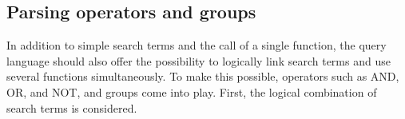 \subsection{Parsing operators and groups}
In addition to simple search terms and the call of a single function, the query language should also offer the possibility to logically link search terms and use several functions simultaneously. To make this possible, operators such as AND, OR, and NOT, and groups come into play. First, the logical combination of search terms is considered.